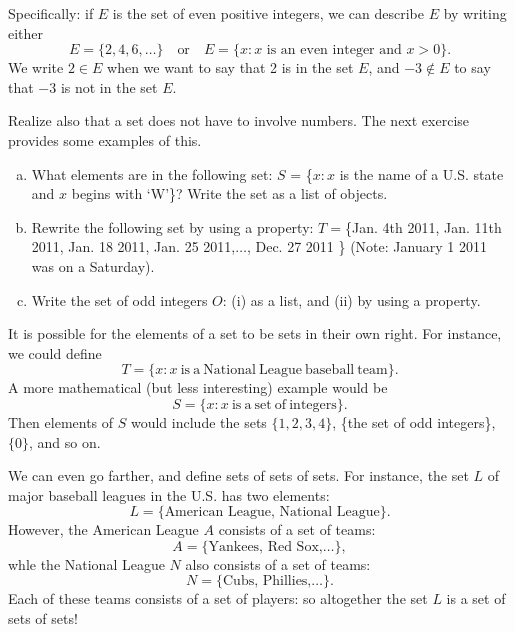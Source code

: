 Specifically: if $E$ is the set of even positive integers, we can describe $E$ by writing either 
\[
E = \{2, 4, 6, \ldots \}
\quad \text{or} \quad
E = \{ x : x \text{ is an even integer and } x > 0 \}.
\]
We write $2 \in E$ when we want to say that 2 is in the set $E$, and $-3 \notin E$ to say that $-3$ is not in the set $E$.

Realize also that a set does not have to involve numbers.  The next exercise provides some examples of this.

\begin{exercise}{}
\begin{enumerate}[(a)]
\item
What elements are in the following set:  $S$ = \{$x : x$ is the name of a U.S. state and $x$ begins with `W'\}?  Write the set as a list of objects.
\item
Rewrite the following set by using a property:  $T = $\{Jan. 4th  2011, Jan. 11th  2011, Jan. 18  2011, Jan. 25  2011,$ \ldots$, Dec. 27 2011 \} (Note: January 1 2011 was on a Saturday).
\item
Write the set of odd integers $O$: (i) as a list, and (ii) by using a property.
\end{enumerate}
\end{exercise}

It is possible for the elements of a set to be sets in their own right. For instance,  we could define
\[T = \{ x : x \mathrm{~is~a~National~League~baseball~team} \}. \]
A more mathematical (but less interesting) example would be
\[S = \{ x : x \mathrm{~is~a~set~of~integers} \}. \]
Then elements of $S$ would include the sets $\{1,2,3,4\}$, \{the set of odd integers\}, $\{ 0 \}$, and so on. 

We can even go farther, and define sets of sets of sets. For instance, the set $L$ of major baseball leagues in the U.S. has two elements: 
\[L = \{ \text{American League, National League} \}. \]
However, the American League $A$ consists of a set of teams:
\[A = \{ \text{Yankees, Red Sox,} \ldots \}, \]
whle the National League $N$ also consists of a set of teams:
\[N = \{ \text{Cubs, Phillies,} \ldots \}. \]
Each of these teams consists of a set of players: so altogether the set $L$ is a set of sets of sets!

